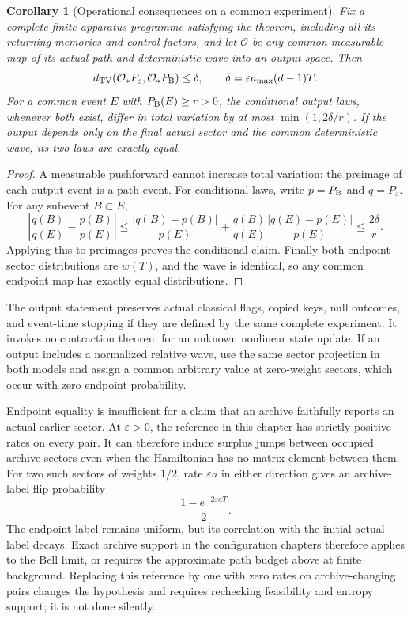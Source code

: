 \documentclass[11pt,oneside,openany]{book}
\newtheorem{corollary}[theorem]{Corollary}
\theoremstyle{definition}
\theoremstyle{remark}\newtheorem{remark}[theorem]{Remark}
\begin{document}
\begin{corollary}[Operational consequences on a common experiment]
\label{stat:output-bound}
Fix a complete finite apparatus programme satisfying the theorem, including
all its returning memories and control factors, and let $\mathcal O$ be
any common measurable map of its actual path and deterministic wave into
an output space. Then
\begin{equation}\label{stat:pushforward}
 d_{\rm TV}(\mathcal O_*P_\varepsilon,\mathcal O_*P_{\rm B})
 \leq\delta,
 \qquad \delta=\varepsilon a_{\max}(d-1)T.
\end{equation}
For a common event $E$ with $P_{\rm B}(E)\geq r>0$, the conditional output
laws, whenever both exist, differ in total variation by at most
$\min(1,2\delta/r)$. If the output depends only on the final actual sector
and the common deterministic wave, its two laws are exactly equal.
\end{corollary}
\begin{proof}
A measurable pushforward cannot increase total variation: the preimage of
each output event is a path event. For conditional laws, write $p=P_{\rm B}$
and $q=P_\varepsilon$. For any subevent $B\subset E$,
\[
 \left|\frac{q(B)}{q(E)}-\frac{p(B)}{p(E)}\right|
 \leq \frac{|q(B)-p(B)|}{p(E)}
       +\frac{q(B)}{q(E)}\frac{|q(E)-p(E)|}{p(E)}
 \leq\frac{2\delta}{r}.
\]
Applying this to preimages proves the conditional claim. Finally both
endpoint sector distributions are $w(T)$, and the wave is identical, so
any common endpoint map has exactly equal distributions.
\end{proof}

The output statement preserves actual classical flags, copied keys, null
outcomes, and event-time stopping if they are defined by the same complete
experiment. It invokes no contraction theorem for an unknown nonlinear
state update. If an output includes a normalized relative wave, use the
same sector projection in both models and assign a common arbitrary value
at zero-weight sectors, which occur with zero endpoint probability.

Endpoint equality is insufficient for a claim that an archive faithfully
reports an actual earlier sector. At $\varepsilon>0$, the reference in this
chapter has strictly positive rates on every pair. It can therefore induce
surplus jumps between occupied archive sectors even when the Hamiltonian
has no matrix element between them. For two such sectors of weights
$1/2$, rate $\varepsilon a$ in either direction gives an archive-label flip
probability
\begin{equation}\label{stat:archive-background}
 \frac{1-e^{-2\varepsilon aT}}{2}.
\end{equation}
The endpoint label remains uniform, but its correlation with the initial
actual label decays. Exact archive support in the configuration chapters
therefore applies to the Bell limit, or requires the approximate path
budget above at finite background. Replacing this reference by one with
zero rates on archive-changing pairs changes the hypothesis and requires
rechecking feasibility and entropy support; it is not done silently.
\end{document}
